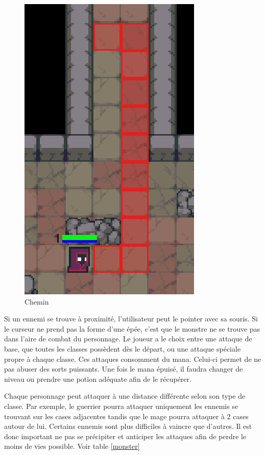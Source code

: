 \documentclass[a4paper, 12pt, twoside]{article}
\begin{document}
\begin{figure}[H]
    \begin{center}
	\includegraphics[scale=0.3]{GraphiqueInGame/CheminSelection}
	\caption{Chemin}
	\label{Chemin}
	\end{center}
\end{figure}
 Si un ennemi se trouve à proximité, l'utilisateur peut le pointer avec sa souris. Si le curseur ne prend pas la forme d'une épée, c'est que le monstre ne se trouve pas dans l'aire de combat du personnage. Le joueur a le choix entre une attaque de base, que toutes les classes possèdent dès le départ, ou une attaque spéciale propre à chaque classe. Ces attaques consomment du mana. Celui-ci permet de ne pas abuser des sorts puissants. Une fois le mana épuisé, il faudra changer de niveau ou prendre une potion adéquate afin de le récupérer.\\\par
Chaque personnage peut attaquer à une distance différente selon son type de classe. Par exemple, le guerrier pourra attaquer uniquement les ennemis se trouvant sur les cases adjacentes tandis que le mage pourra attaquer à 2 cases autour de lui.
Certains ennemis sont plus difficiles à vaincre que d'autres. Il est donc important ne pas se précipiter et anticiper les attaques afin de perdre le moins de vies possible. Voir table \ref{monster}\par
\end{document}
